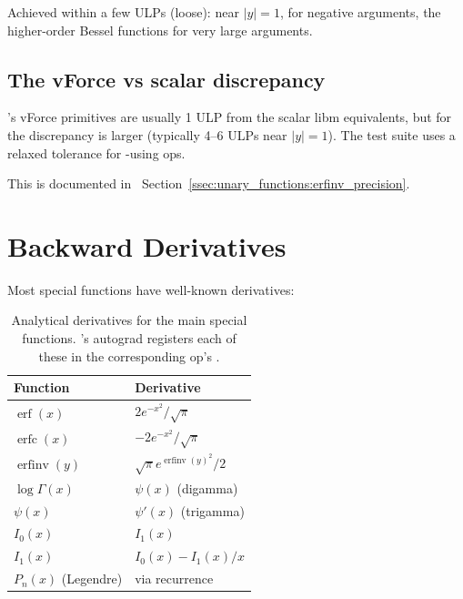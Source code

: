 Achieved within a few ULPs (loose):  near $|y| =
1$,  for negative arguments, the higher-order
Bessel functions for very large arguments.

\subsection{The vForce vs scalar discrepancy}
\label{ssec:special_functions:vforce_scalar}

\Accelerate's vForce primitives are usually 1 ULP from the
scalar libm equivalents, but for  the
discrepancy is larger (typically 4--6 ULPs near $|y| = 1$). The
test suite uses a relaxed tolerance for -using
ops.

This is documented in
~Section~\ref{ssec:unary_functions:erfinv_precision}.

\section{Backward Derivatives}
\label{sec:special_functions:backward}

Most special functions have well-known derivatives:

\begin{table}[t]
\centering
\small
\begin{tabular}{ll}
\toprule
Function & Derivative \\
\midrule
$\operatorname{erf}(x)$    & $2 e^{-x^2} / \sqrt{\pi}$ \\
$\operatorname{erfc}(x)$   & $-2 e^{-x^2} / \sqrt{\pi}$ \\
$\operatorname{erfinv}(y)$ & $\sqrt{\pi} e^{\operatorname{erfinv}(y)^2} / 2$ \\
$\log \Gamma(x)$           & $\psi(x)$ (digamma) \\
$\psi(x)$                  & $\psi'(x)$ (trigamma) \\
$I_0(x)$                   & $I_1(x)$ \\
$I_1(x)$                   & $I_0(x) - I_1(x) / x$ \\
$P_n(x)$ (Legendre)        & via recurrence \\
\bottomrule
\end{tabular}
\caption[Special-function derivatives.]{Analytical derivatives
for the main special functions. \Lucid's autograd registers each
of these in the corresponding op's .}
\label{tab:special_functions:derivatives}
\end{table}

